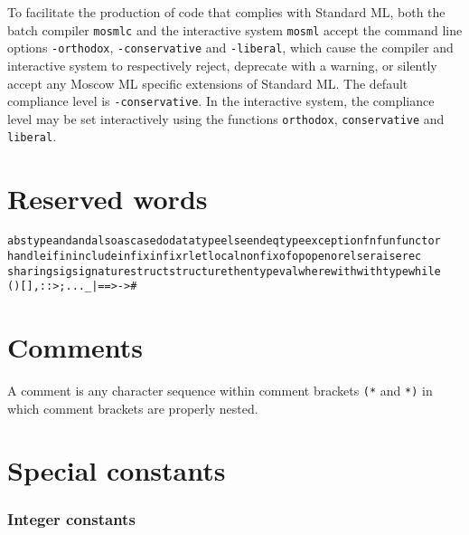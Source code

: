 \documentclass[fleqn]{article}
\begin{document}
To facilitate the production of code that complies with Standard ML,
both the batch compiler {\tt mosmlc} and the interactive system {\tt mosml}
accept the command line options {\tt -orthodox}, {\tt -conservative}
and {\tt -liberal}, which cause the compiler and interactive system to respectively reject, deprecate with a warning, or silently accept any Moscow ML  specific 
extensions of Standard ML. The default compliance level
is {\tt -conservative}. In the interactive system,
the compliance level may be set interactively using the functions 
{\tt orthodox}, {\tt conservative} and {\tt liberal}. 

\section{Reserved words}
\label{sec-reserved-words}


{\small\begin{alltt} 
abstype  and  andalso  as  case  do  datatype  else  end eqtype exception  fn  fun  functor 
handle  if  in  include  infix  infixr  let  local  nonfix  of  op  open  orelse  raise  rec  
sharing  sig  signature  struct  structure  then  type  val  where  with  withtype  while  
(  )  [  ]  {  }  ,  :  :>  ;  ...    _  |  =  =>  ->  #
\end{alltt}}


\section{Comments}
\label{sec-comments}

A comment is any character sequence within comment brackets \verb#(*#
and \verb#*)# in which comment brackets are properly nested.


\section{Special constants}
\label{sec-special-constants}


\subsubsection*{Integer constants}
\end{document}
